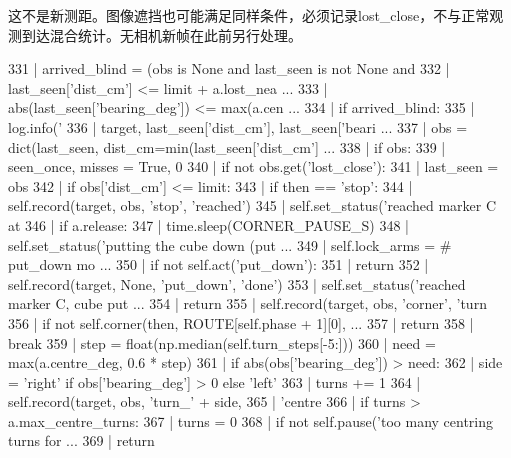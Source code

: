 这不是新测距。图像遮挡也可能满足同样条件，必须记录lost\_close，不与正常观测到达混合统计。无相机新帧在此前另行处理。
\begin{CodeBlock}
 331 |                 arrived_blind = (obs is None and last_seen is not None and
 332 |                                  last_seen['dist_cm'] <= limit + a.lost_nea ...
 333 |                                  abs(last_seen['bearing_deg']) <= max(a.cen ...
 334 |                 if arrived_blind:
 335 |                     log.info('%
 336 |                              target, last_seen['dist_cm'], last_seen['beari ...
 337 |                     obs = dict(last_seen, dist_cm=min(last_seen['dist_cm']  ...
 338 |                 if obs:
 339 |                     seen_once, misses = True, 0
 340 |                     if not obs.get('lost_close'):
 341 |                         last_seen = obs
 342 |                     if obs['dist_cm'] <= limit:
 343 |                         if then == 'stop':
 344 |                             self.record(target, obs, 'stop', 'reached')
 345 |                             self.set_status('reached marker C at %
 346 |                             if a.release:
 347 |                                 time.sleep(CORNER_PAUSE_S)
 348 |                                 self.set_status('putting the cube down (put ...
 349 |                                 self.lock_arms = {}          # put_down mo  ...
 350 |                                 if not self.act('put_down'):
 351 |                                     return
 352 |                                 self.record(target, None, 'put_down', 'done')
 353 |                                 self.set_status('reached marker C, cube put ...
 354 |                             return
 355 |                         self.record(target, obs, 'corner', 'turn %
 356 |                         if not self.corner(then, ROUTE[self.phase + 1][0],  ...
 357 |                             return
 358 |                         break
 359 |                     step = float(np.median(self.turn_steps[-5:]))
 360 |                     need = max(a.centre_deg, 0.6 * step)
 361 |                     if abs(obs['bearing_deg']) > need:
 362 |                         side = 'right' if obs['bearing_deg'] > 0 else 'left'
 363 |                         turns += 1
 364 |                         self.record(target, obs, 'turn_' + side,
 365 |                                     'centre %
 366 |                         if turns > a.max_centre_turns:
 367 |                             turns = 0
 368 |                             if not self.pause('too many centring turns for  ...
 369 |                                 return
\end{CodeBlock}
